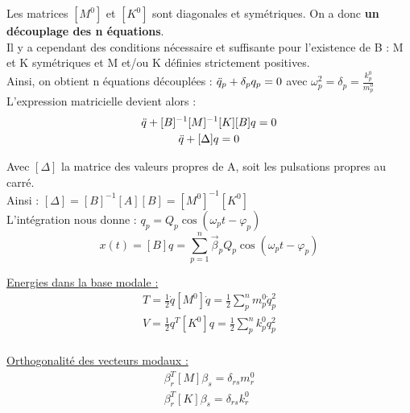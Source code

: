 \documentclass[../main.tex]{subfiles}
\begin{document}
Les matrices $[M^0]$ et $[K^0]$ sont diagonales et symétriques. On a donc \textbf{un découplage des n équations}.\\
Il y a cependant des conditions nécessaire et suffisante pour l'existence de B : M et K symétriques et M et/ou K définies strictement positives.\\

Ainsi, on obtient n équations découplées : $\Ddot{q}_p + \delta_p q_p = 0$ avec $\omega_p^2 = \delta_p = \frac{k_p^0}{m_p^0}$\\

L'expression matricielle devient alors : \begin{equation}\begin{gathered}
    \Ddot{q} + [B]^{-1}[M]^{-1}[K][B]q = 0\\
    \Ddot{q} + [\Delta] q = 0
    \end{gathered}
\end{equation}

Avec $[\Delta]$ la matrice des valeurs propres de A, soit les pulsations propres au carré.\\

Ainsi : $[\Delta] = [B]^{-1}[A][B] = [M^0]^{-1}[K^0]$\\

L'intégration nous donne : $q_p = Q_p \cos(\omega_pt-\varphi_p)$\\

\begin{equation}
    x(t) = [B]q = \sum_{p=1}^n \Vec{\beta}_p Q_p \cos(\omega_pt-\varphi_p)
\end{equation}

\quad \underline{Energies dans la base modale :}\\
\begin{equation}
    \begin{gathered}
        T = \frac{1}{2}\dot{q} [M^0]\dot{q} = \frac{1}{2}\sum_p^n m_p^0\dot{q}_p^2\\
        V = \frac{1}{2}q^T[K^0]q = \frac{1}{2} \sum_p^n k_p^0 q_p^2\\
    \end{gathered}
\end{equation}

\quad \underline{Orthogonalité des vecteurs modaux :}\\

\begin{equation}
    \begin{gathered}
        \beta_r^T [M] \beta_s = \delta_{rs} m_r^0\\
        \beta_r^T [K] \beta_s = \delta_{rs} k_r^0\\
    \end{gathered}
\end{equation}
\end{document}
